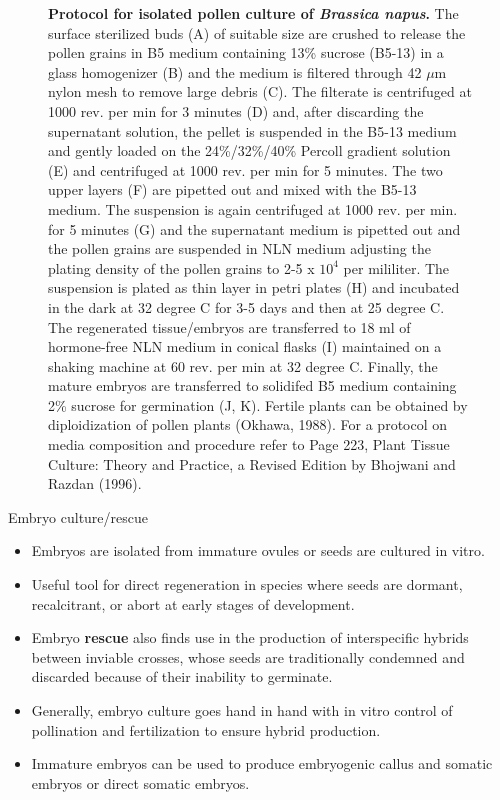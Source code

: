 \documentclass[
  ignorenonframetext,
  aspectratio=169]{beamer}
\providecommand{\tightlist}{%
  \setlength{\itemsep}{0pt}\setlength{\parskip}{0pt}}
\begin{document}
\begin{frame}{}
\begin{figure}
\begin{columns}[T,onlytextwidth]
  \caption{\newline\tiny \textbf{Protocol for isolated pollen culture of \textit{Brassica napus}.} The surface sterilized buds (A) of suitable size are crushed to release the pollen grains in B5 medium containing 13\% sucrose (B5-13) in a glass homogenizer (B) and the medium is filtered through 42 $\mu$m nylon mesh to remove large debris (C). The filterate is centrifuged at 1000 rev. per min for 3 minutes (D) and, after discarding the supernatant solution, the pellet is suspended in the B5-13 medium and gently loaded on the 24\%/32\%/40\% Percoll gradient solution (E) and centrifuged at 1000 rev. per min for 5 minutes. The two upper layers (F) are pipetted out and mixed with the B5-13 medium. The suspension is again centrifuged at 1000 rev. per min. for 5 minutes (G) and the supernatant medium is pipetted out and the pollen grains are suspended in NLN medium adjusting the plating density of the pollen grains to 2-5 x $10^4$ per mililiter. The suspension is plated as thin layer in petri plates (H) and incubated in the dark at 32 degree C for 3-5 days and then at 25 degree C. The regenerated tissue/embryos are transferred to 18 ml of hormone-free NLN medium in conical flasks (I) maintained on a shaking machine at 60 rev. per min at 32 degree C. Finally, the mature embryos are transferred to solidifed B5 medium containing 2\% sucrose for germination (J, K). Fertile plants can be obtained by diploidization of pollen plants (Okhawa, 1988). For a protocol on media composition and procedure refer to Page 223, Plant Tissue Culture: Theory and Practice, a Revised Edition by Bhojwani and Razdan (1996).}
  \label{fig:isolated-pollen-culture}
  
  \end{columns}
\end{figure}
\end{frame}

\begin{frame}{Embryo culture/rescue}
\protect\hypertarget{embryo-culturerescue}{}
\begin{itemize}
\tightlist
\item
  Embryos are isolated from immature ovules or seeds are cultured in
  vitro.
\item
  Useful tool for direct regeneration in species where seeds are
  dormant, recalcitrant, or abort at early stages of development.
\item
  Embryo \textbf{rescue} also finds use in the production of
  interspecific hybrids between inviable crosses, whose seeds are
  traditionally condemned and discarded because of their inability to
  germinate.
\item
  Generally, embryo culture goes hand in hand with in vitro control of
  pollination and fertilization to ensure hybrid production.
\item
  Immature embryos can be used to produce embryogenic callus and somatic
  embryos or direct somatic embryos.
\end{itemize}
\end{frame}
\end{document}
